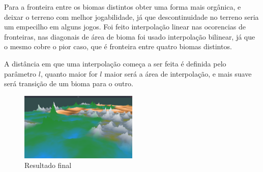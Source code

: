 Para a fronteira entre os biomas distintos obter uma forma mais orgânica, e deixar o 
terreno com melhor jogabilidade, já que descontinuidade no terreno seria um empecilho em alguns jogos.
Foi feito interpolação linear nas ocorencias de fronteiras, nas diagonais de área de bioma foi 
usado interpolação bilinear, já que o mesmo cobre o pior caso, que é fronteira entre quatro biomas distintos.%

A distância em que uma interpolação começa a ser feita é definida pelo parâmetro $l$,
quanto maior for $l$ maior será a área de interpolação, e mais suave será transição de um bioma para o outro.








\begin{figure}[H]
    \centering
    \includegraphics[width=0.5\textwidth]{figuras/ssFinalResult.png}
    \caption{Resultado final}
    \label{fig:ssFinalResult}
\end{figure}

